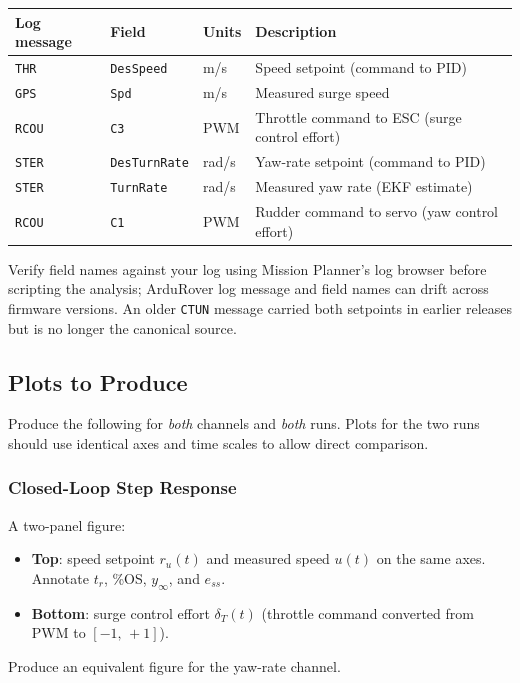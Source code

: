 \documentclass[../../book.tex]{subfiles}
\begin{document}
\vspace{6pt}
\begin{center}
\begin{tabular}{L{2.8cm} L{2.8cm} C{1.8cm} L{5.0cm}}
  \textbf{Log message} & \textbf{Field} & \textbf{Units} & \textbf{Description} \\
  \midrule
  \texttt{THR}  & \texttt{DesSpeed}    & m/s   & Speed setpoint (command to PID) \\[3pt]
  \texttt{GPS}  & \texttt{Spd}         & m/s   & Measured surge speed \\[3pt]
  \texttt{RCOU} & \texttt{C3}          & PWM   & Throttle command to ESC (surge control effort) \\[5pt]
  \texttt{STER} & \texttt{DesTurnRate} & rad/s & Yaw-rate setpoint (command to PID) \\[3pt]
  \texttt{STER} & \texttt{TurnRate}    & rad/s & Measured yaw rate (EKF estimate) \\[3pt]
  \texttt{RCOU} & \texttt{C1}          & PWM   & Rudder command to servo (yaw control effort) \\[3pt]
  \bottomrule
\end{tabular}
\end{center}
\vspace{4pt}
{\small Verify field names against your log using Mission Planner's log browser before scripting the analysis; ArduRover log message and field names can drift across firmware versions.  An older \texttt{CTUN} message carried both setpoints in earlier releases but is no longer the canonical source.}
\vspace{6pt}

\subsection{Plots to Produce}

Produce the following for \emph{both} channels and \emph{both} runs.  Plots for the two runs should use identical axes and time scales to allow direct comparison.

\subsubsection{Closed-Loop Step Response}

A two-panel figure:
\begin{itemize}
  \item \textbf{Top}: speed setpoint $r_u(t)$ and measured speed $u(t)$ on the same axes.  Annotate $t_r$, \%OS, $y_\infty$, and $e_{ss}$.
  \item \textbf{Bottom}: surge control effort $\delta_T(t)$ (throttle command converted from PWM to $[-1,\,+1]$).
\end{itemize}
Produce an equivalent figure for the yaw-rate channel.
\end{document}
